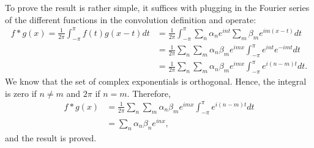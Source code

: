 \begin{questions}

\begin{solution}
To prove the result is rather simple, it suffices with plugging in the Fourier series of the different functions in the convolution definition and operate:
\begin{align*}
f*g(x)=\frac{1}{2\pi}\int_{-\pi}^{\pi}f(t)g(x-t)dt&=\frac{1}{2\pi}\int_{-\pi}^{\pi}\sum_n\alpha_ne^{int}\sum_m\beta_me^{im(x-t)}dt\\
&=\frac{1}{2\pi}\sum_n\sum_m\alpha_n\beta_me^{imx}\int_{-\pi}^{\pi}e^{int}e^{-imt}dt\\
&=\frac{1}{2\pi}\sum_n\sum_m\alpha_n\beta_me^{imx}\int_{-\pi}^{\pi}e^{i(n-m)t}dt.
\end{align*}
We know that the set of complex exponentials is orthogonal. Hence, the integral is zero if $n\neq m$ and $2\pi$ if $n=m$. Therefore,
\begin{align*}
f*g(x)&=\frac{1}{2\pi}\sum_n\sum_m\alpha_n\beta_me^{imx}\int_{-\pi}^{\pi}e^{i(n-m)t}dt\\
&=\sum_n\alpha_n\beta_ne^{inx},
\end{align*}
and the result is proved.
\end{solution}
\end{questions}
